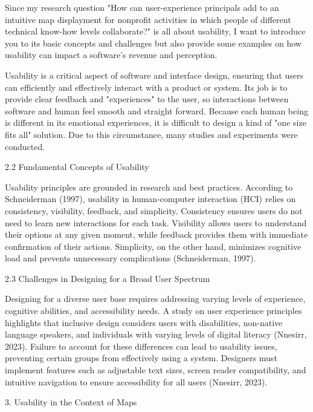 \author{\daAuthorTwo}

Since my research question "How can user-experience principals add to an intuitive map displayment for nonprofit activities in which people of different technical know-how levels collaborate?" is all about usability, I want to introduce you to its basic concepts and challenges but also provide some examples on how usability can impact a software's revenue and perception.

\blankLine

Usability is a critical aspect of software and interface design, ensuring that users can efficiently and effectively interact with a product or system. Its job is to provide clear feedback and "experiences" to the user, so interactions between software and human feel smooth and straight forward. Because each human being is different in its emotional experiences, it is difficult to design a kind of "one size fits all" solution. Due to this circumstance, many studies and experiments were conducted.   
\autocite{Paul:Usability101}

2.2 Fundamental Concepts of Usability

Usability principles are grounded in research and best practices. According to Schneiderman (1997), usability in human-computer interaction (HCI) relies on consistency, visibility, feedback, and simplicity. Consistency ensures users do not need to learn new interactions for each task. Visibility allows users to understand their options at any given moment, while feedback provides them with immediate confirmation of their actions. Simplicity, on the other hand, minimizes cognitive load and prevents unnecessary complications (Schneiderman, 1997).

2.3 Challenges in Designing for a Broad User Spectrum

Designing for a diverse user base requires addressing varying levels of experience, cognitive abilities, and accessibility needs. A study on user experience principles highlights that inclusive design considers users with disabilities, non-native language speakers, and individuals with varying levels of digital literacy (Nnesirr, 2023). Failure to account for these differences can lead to usability issues, preventing certain groups from effectively using a system. Designers must implement features such as adjustable text sizes, screen reader compatibility, and intuitive navigation to ensure accessibility for all users (Nnesirr, 2023).

3. Usability in the Context of Maps

